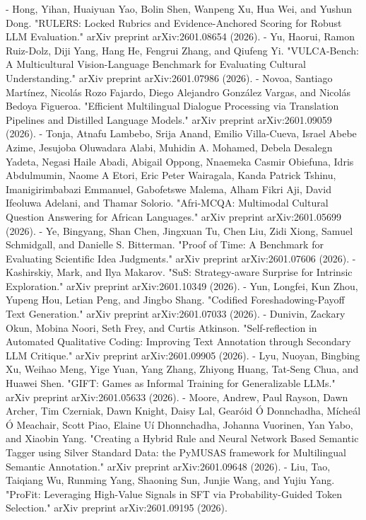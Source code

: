 - Hong, Yihan, Huaiyuan Yao, Bolin Shen, Wanpeng Xu, Hua Wei, and Yushun Dong. "RULERS: Locked Rubrics and Evidence-Anchored Scoring for Robust LLM Evaluation." arXiv preprint arXiv:2601.08654 (2026).
- Yu, Haorui, Ramon Ruiz-Dolz, Diji Yang, Hang He, Fengrui Zhang, and Qiufeng Yi. "VULCA-Bench: A Multicultural Vision-Language Benchmark for Evaluating Cultural Understanding." arXiv preprint arXiv:2601.07986 (2026).
- Novoa, Santiago Martínez, Nicolás Rozo Fajardo, Diego Alejandro González Vargas, and Nicolás Bedoya Figueroa. "Efficient Multilingual Dialogue Processing via Translation Pipelines and Distilled Language Models." arXiv preprint arXiv:2601.09059 (2026).
- Tonja, Atnafu Lambebo, Srija Anand, Emilio Villa-Cueva, Israel Abebe Azime, Jesujoba Oluwadara Alabi, Muhidin A. Mohamed, Debela Desalegn Yadeta, Negasi Haile Abadi, Abigail Oppong, Nnaemeka Casmir Obiefuna, Idris Abdulmumin, Naome A Etori, Eric Peter Wairagala, Kanda Patrick Tshinu, Imanigirimbabazi Emmanuel, Gabofetswe Malema, Alham Fikri Aji, David Ifeoluwa Adelani, and Thamar Solorio. "Afri-MCQA: Multimodal Cultural Question Answering for African Languages." arXiv preprint arXiv:2601.05699 (2026).
- Ye, Bingyang, Shan Chen, Jingxuan Tu, Chen Liu, Zidi Xiong, Samuel Schmidgall, and Danielle S. Bitterman. "Proof of Time: A Benchmark for Evaluating Scientific Idea Judgments." arXiv preprint arXiv:2601.07606 (2026).
- Kashirskiy, Mark, and Ilya Makarov. "SuS: Strategy-aware Surprise for Intrinsic Exploration." arXiv preprint arXiv:2601.10349 (2026).
- Yun, Longfei, Kun Zhou, Yupeng Hou, Letian Peng, and Jingbo Shang. "Codified Foreshadowing-Payoff Text Generation." arXiv preprint arXiv:2601.07033 (2026).
- Dunivin, Zackary Okun, Mobina Noori, Seth Frey, and Curtis Atkinson. "Self-reflection in Automated Qualitative Coding: Improving Text Annotation through Secondary LLM Critique." arXiv preprint arXiv:2601.09905 (2026).
- Lyu, Nuoyan, Bingbing Xu, Weihao Meng, Yige Yuan, Yang Zhang, Zhiyong Huang, Tat-Seng Chua, and Huawei Shen. "GIFT: Games as Informal Training for Generalizable LLMs." arXiv preprint arXiv:2601.05633 (2026).
- Moore, Andrew, Paul Rayson, Dawn Archer, Tim Czerniak, Dawn Knight, Daisy Lal, Gearóid Ó Donnchadha, Mícheál Ó Meachair, Scott Piao, Elaine Uí Dhonnchadha, Johanna Vuorinen, Yan Yabo, and Xiaobin Yang. "Creating a Hybrid Rule and Neural Network Based Semantic Tagger using Silver Standard Data: the PyMUSAS framework for Multilingual Semantic Annotation." arXiv preprint arXiv:2601.09648 (2026).
- Liu, Tao, Taiqiang Wu, Runming Yang, Shaoning Sun, Junjie Wang, and Yujiu Yang. "ProFit: Leveraging High-Value Signals in SFT via Probability-Guided Token Selection." arXiv preprint arXiv:2601.09195 (2026).
